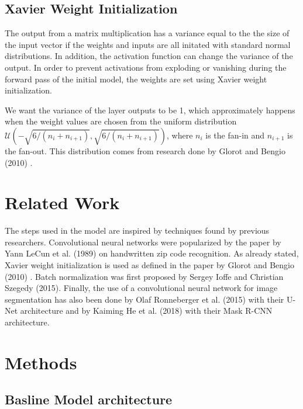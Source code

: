 \documentclass{article}
\begin{document}
\subsection{Xavier Weight Initialization}
The output from a matrix multiplication has a variance equal to the 
the size of the input vector if the weights and inputs 
are all initated with standard normal distributions.
In addition, the activation function can change the variance of the output.
In order to prevent activations from exploding or vanishing during the forward pass of the initial model,
the weights are set using Xavier weight initialization.

We want the variance of the layer outputs to be 1, which approximately happens when 
the weight values are chosen from the uniform distribution 
$\mathcal{U}(-\sqrt{6/(n_i + n_{i+1})}, \sqrt{6/(n_i + n_{i+1})})$,
where $n_i$ is the fan-in and $n_{i+1}$ is the fan-out.
This distribution comes from research done by Glorot and Bengio (2010) \cite{Xavier_2010}.

\section{Related Work}
The steps used in the model are inspired by techniques found by previous researchers.
Convolutional neural networks were popularized by the paper by Yann LeCun et al. (1989) \cite{LeCun_1989} on handwritten zip code recognition.
As already stated, Xavier weight initialization is used as defined in the paper by Glorot and Bengio (2010) \cite{Xavier_2010}.
Batch normalization was first proposed by Sergey Ioffe and Christian Szegedy (2015)\cite{Ioffe_2015}.
Finally, the use of a convolutional neural network for image segmentation 
has also been done by Olaf Ronneberger et al. (2015) with their U-Net architecture \cite{Ronneberger_2015}
and by Kaiming He et al. (2018) \cite{Kaiming_2018} with their Mask R-CNN architecture.


\section{Methods}
\subsection{Basline Model architecture}
\end{document}

